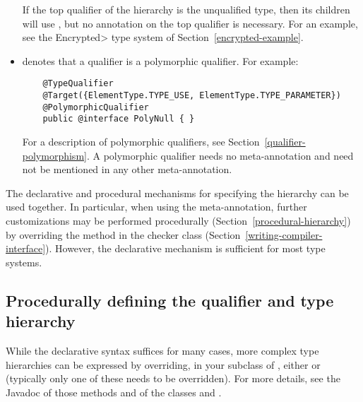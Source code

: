 \begin{itemize}
  If the top qualifier of the hierarchy is the unqualified type, then its children
  will use , but no  annotation on the top qualifier is necessary.  For an example, see the
  \<Encrypted> type system of Section~\ref{encrypted-example}.

\item {} denotes that a qualifier is a
  polymorphic qualifier.  For example:

  \begin{Verbatim}
    @TypeQualifier
    @Target({ElementType.TYPE_USE, ElementType.TYPE_PARAMETER})
    @PolymorphicQualifier
    public @interface PolyNull { }
  \end{Verbatim}

  For a description of polymorphic qualifiers, see
  Section~\ref{qualifier-polymorphism}.  A polymorphic qualifier needs
  no  meta-annotation and need not be
  mentioned in any other 
  meta-annotation.

\end{itemize}

The declarative and procedural mechanisms for specifying the hierarchy can
be used together.  In particular, when using the 
meta-annotation, further customizations may be
performed procedurally (Section~\ref{procedural-hierarchy})
by overriding the  method in the checker class
(Section~\ref{writing-compiler-interface}).
However, the declarative mechanism is sufficient for most type systems.


\subsection{Procedurally defining the qualifier and type hierarchy\label{procedural-hierarchy}}

While the declarative syntax suffices for many cases, more complex
type hierarchies can be expressed by overriding, in your subclass of ,
either  or  (typically
only one of these needs to be overridden).
For more details, see the Javadoc of those methods and of the classes
 and .

